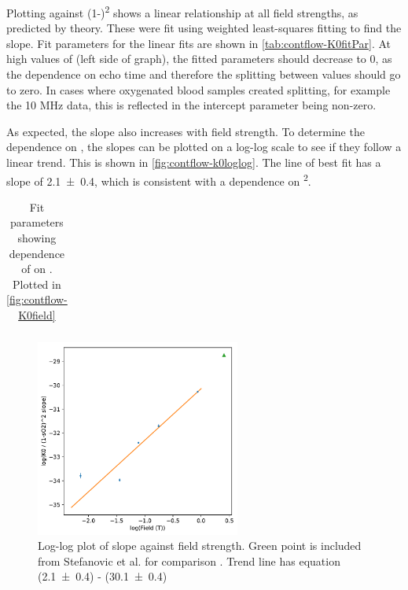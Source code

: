 Plotting \Kzero against (1-\SOtwo)\textsuperscript{2} shows a linear relationship at all field strengths, as predicted by theory.
These were fit using weighted least-squares fitting to find the slope.
Fit parameters for the linear fits are shown in \autoref{tab:contflow-K0fitPar}.
At high values of \SOtwo (left side of graph), the fitted \Kzero parameters should decrease to 0, as the dependence on echo time and therefore the splitting between \Ttwo values should go to zero.
In cases where oxygenated blood samples created splitting, for example the 10 MHz data, this is reflected in the intercept parameter being non-zero.

As expected, the slope also increases with field strength.
To determine the dependence on \Bzero, the slopes can be plotted on a log-log scale to see if they follow a linear trend.
This is shown in \autoref{fig:contflow-k0loglog}.
The line of best fit has a slope of \num{2.1\pm0.4}, which is consistent with a dependence on \Bzero\textsuperscript{2}.

\begin{table}[t]

\centering
\begin{tabular}{|c|cc|c|}
\hline

\hline
\end{tabular}
\caption[Fit parameters for dependence of \Kzero on \SOtwo]{Fit parameters showing dependence of \Kzero on \SOtwo. Plotted in \autoref{fig:contflow-K0field}}
\label{tab:contflow-K0fitPar}
\end{table}

\begin{figure}[tbh]
\centering
\includegraphics[width=0.6\textwidth]{figures/contflow/k0slopefield.pdf}
\caption[\Kzero slope dependence on \Bzero]{Log-log plot of \Kzero slope against field strength. Green point is included from Stefanovic et al. for comparison \cite{StefanovicHumanwholebloodrelaxometry2004}. Trend line has equation (\num{2.1\pm0.4}) \Bzero - (\num{30.1\pm0.4})}
\label{fig:contflow-k0loglog}
\end{figure}

